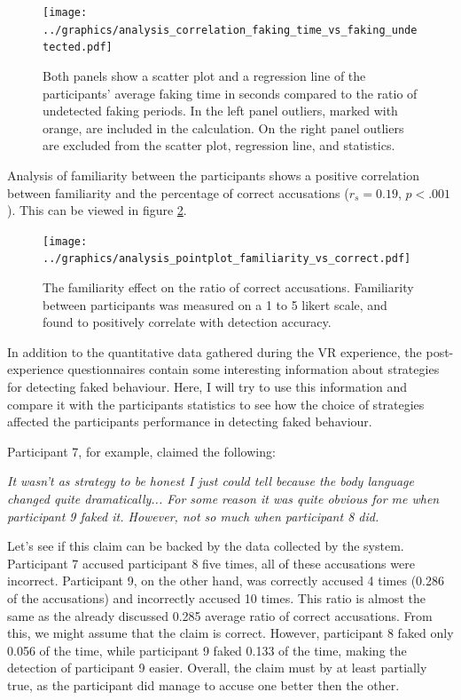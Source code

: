 \documentclass[]{simple-thesis}
\begin{document}
\begin{figure}
  \centering
  \texttt{[image: ../graphics/analysis\_correlation\_faking\_time\_vs\_faking\_undetected.pdf]}
  \caption{Both panels show a scatter plot and a regression line of the participants' average faking time in seconds compared to the ratio of undetected faking periods. In the left panel outliers, marked with orange, are included in the calculation. On the right panel outliers are excluded from the scatter plot, regression line, and statistics.}
  \label{fig:analysis:analysis_correlation_faking_time_vs_faking_undetected}
\end{figure}

Analysis of familiarity between the participants shows a positive correlation between familiarity and the percentage of correct accusations ($r_s = 0.19$, $p < .001$).
This can be viewed in figure \ref{fig:analysis:analysis_pointplot_familiarity_vs_correct}.

\begin{figure}
  \centering
  \texttt{[image: ../graphics/analysis\_pointplot\_familiarity\_vs\_correct.pdf]}
  \caption{The familiarity effect on the ratio of correct accusations. Familiarity between participants was measured on a 1 to 5 likert scale, and found to positively correlate with detection accuracy.}
  \label{fig:analysis:analysis_pointplot_familiarity_vs_correct}
\end{figure}

In addition to the quantitative data gathered during the VR experience, the post-experience questionnaires contain some interesting information about strategies for detecting faked behaviour.
Here, I will try to use this information and compare it with the participants statistics to see how the choice of strategies affected the participants performance in detecting faked behaviour.

Participant 7, for example, claimed the following:

\begin{displayquote}
  \textit{
    It wasn't as strategy to be honest I just could tell because the body language changed quite dramatically...
    For some reason it was quite obvious for me when participant 9 faked it.
    However, not so much when participant 8 did.
  }
\end{displayquote}

Let's see if this claim can be backed by the data collected by the system.
Participant 7 accused participant 8 five times, all of these accusations were incorrect.
Participant 9, on the other hand, was correctly accused 4 times (0.286 of the accusations) and incorrectly accused 10 times.
This ratio is almost the same as the already discussed 0.285 average ratio of correct accusations.
From this, we might assume that the claim is correct.
However, participant 8 faked only 0.056 of the time, while participant 9 faked 0.133 of the time, making the detection of participant 9 easier.
Overall, the claim must by at least partially true, as the participant did manage to accuse one better then the other.
\end{document}

